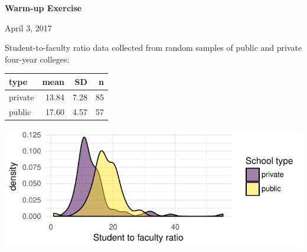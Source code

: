 \documentclass{article}\usepackage[]{graphicx}\usepackage[]{color}
\makeatletter
\def\maxwidth{ %
  \ifdim\Gin@nat@width>\linewidth
    \linewidth
  \else
    \Gin@nat@width
  \fi
}
\newenvironment{knitrout}{}{} %
\makeatother
\begin{document}
{\Large \bf Warm-up Exercise}

April 3, 2017

\bigskip

Student-to-faculty ratio data collected from random samples of public and private four-year colleges:

\begin{minipage}[c]{0.4\textwidth}
\begin{center}
\begin{tabular}{lrrr}
  \hline
type & mean & SD & n \\ 
  \hline
private & 13.84 & 7.28 &  85 \\ 
  public & 17.60 & 4.57 &  57 \\ 
   \hline
\end{tabular}
\end{center}
\end{minipage}
\begin{minipage}[c]{0.6\textwidth}
\begin{center}




\begin{knitrout}
\color{fgcolor}
\includegraphics[width=\maxwidth]{figure/unnamed-chunk-1-1} 

\end{knitrout}
\end{center}
\end{minipage}
\end{document}
